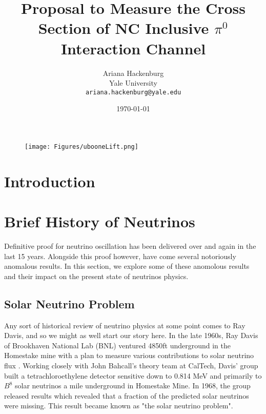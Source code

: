 \documentclass[12pt]{article}
\begin{document}
\title{Proposal to Measure the Cross Section of NC Inclusive $\pi^0$ Interaction Channel }
\author{Ariana Hackenburg  \\Yale University \\ 
			\texttt{ariana.hackenburg@yale.edu}}
\date{\today}
\maketitle
\thispagestyle{empty}

\begin{figure}[h!]
\centering
\texttt{[image: Figures/ubooneLift.png]}
\end{figure}

\clearpage

\pagestyle{fancy}%
\fancyhead[C]{}
\renewcommand{\headrulewidth}{0.4pt}%

\tableofcontents
\clearpage

\listoffigures
\setcounter{tocdepth}{3} 

\clearpage
\renewcommand{\thepage}{\arabic{page}}
\setcounter{page}{1}

\section{Introduction}
\section{Brief History of Neutrinos}

Definitive proof for neutrino oscillation has been delivered over and again in the last 15 years. Alongside this proof however, have come several notoriously anomalous results. In this section, we explore some of these anomolous results and their impact on the present state of neutrinos physics. 
\subsection{Solar Neutrino Problem}
Any sort of historical review of neutrino physics at some point comes to Ray Davis, and so we might as well start our story here.  In the late 1960s, Ray Davis of Brookhaven National Lab (BNL) ventured 4850ft underground in the Homestake mine with a plan to measure various contributions to solar neutrino flux \cite{ray0}. Working closely with John Bahcall's theory team at CalTech, Davis' group built a tetrachloroethylene detector sensitive down to 0.814 MeV and primarily to $B^8$ solar neutrinos\cite{ray0} a mile underground in Homestake Mine. In 1968, the group released results which revealed that a fraction of the predicted solar neutrinos were missing. This result became known as "the solar neutrino problem".
\end{document}
